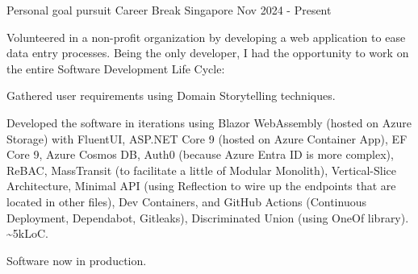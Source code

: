
\begin{cventries}

\cventry
{Personal goal pursuit} %
{Career Break} %
{Singapore} %
{Nov 2024 - Present} %
{
  \begin{cvitems} %
    \item {Volunteered in a non-profit organization by developing a web application to ease data entry processes. Being the only developer, I had the opportunity to work on the entire Software Development Life Cycle:}
    \item {Gathered user requirements using Domain Storytelling techniques.}
    \item {Developed the software in iterations using Blazor WebAssembly (hosted on Azure Storage) with FluentUI, ASP.NET Core 9 (hosted on Azure Container App), EF Core 9, Azure Cosmos DB, Auth0 (because Azure Entra ID is more complex), ReBAC, MassTransit (to facilitate a little of Modular Monolith), Vertical-Slice Architecture, Minimal API (using Reflection to wire up the endpoints that are located in other files), Dev Containers, and GitHub Actions (Continuous Deployment, Dependabot, Gitleaks), Discriminated Union (using OneOf library). \textasciitilde5kLoC.}
    \item {Software now in production.}
  \end{cvitems}
}


\end{cventries}
